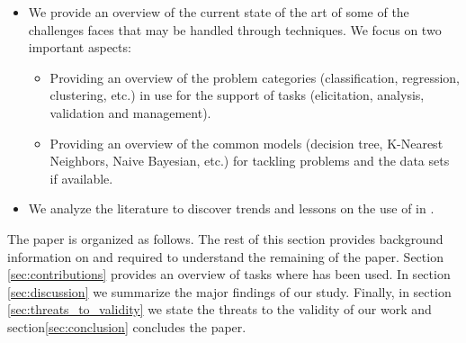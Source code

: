 \begin{itemize}
    \item We provide an overview of the current state of the art of some of the
    challenges \RE faces that may be handled through \ML techniques. We focus on
    two important aspects:
    \begin{itemize}
        \item Providing an overview of the \ML problem categories
        (classification, regression, clustering, etc.) in use for the support of
        \RE tasks (elicitation, analysis, validation and management).
        \item Providing an overview of the common \ML models (decision tree,
        K-Nearest Neighbors, Naive Bayesian, etc.) for tackling \RE problems and
        the data sets if available.
    \end{itemize}
    \item We analyze the literature to discover trends and lessons on the use of \ML in \RE.
\end{itemize}
The paper is organized as follows. The rest of this section provides
background information on \ML and \RE required to understand the remaining of
the paper. Section \ref{sec:contributions} provides an overview of \RE tasks
where \ML has been used. In section \ref{sec:discussion} we summarize the major
findings of our study. Finally, in section \ref{sec:threats_to_validity} we
state the threats to the validity of our work and section\ref{sec:conclusion}
concludes the paper.


